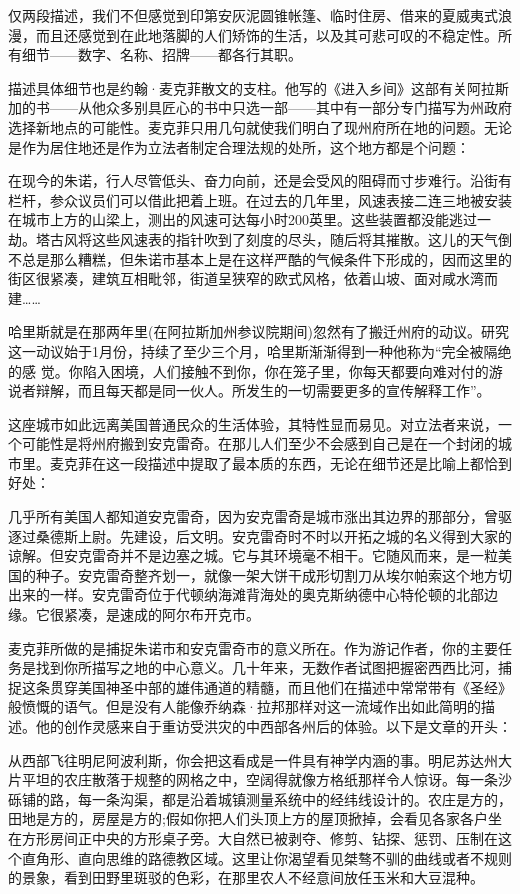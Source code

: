 仅两段描述，我们不但感觉到印第安灰泥圆锥帐篷、临时住房、借来的夏威夷式浪漫，而且还感觉到在此地落脚的人们矫饰的生活，以及其可悲可叹的不稳定性。所有细节——数字、名称、招牌——都各行其职。

描述具体细节也是约翰·麦克菲散文的支柱。他写的《进入乡间》这部有关阿拉斯加的书——从他众多别具匠心的书中只选一部——其中有一部分专门描写为州政府选择新地点的可能性。麦克菲只用几句就使我们明白了现州府所在地的问题。无论是作为居住地还是作为立法者制定合理法规的处所，这个地方都是个问题：

在现今的朱诺，行人尽管低头、奋力向前，还是会受风的阻碍而寸步难行。沿街有栏杆，参众议员们可以借此把着上班。在过去的几年里，风速表接二连三地被安装在城市上方的山梁上，测出的风速可达每小时200英里。这些装置都没能逃过一劫。塔古风将这些风速表的指针吹到了刻度的尽头，随后将其摧散。这儿的天气倒不总是那么糟糕，但朱诺市基本上是在这样严酷的气候条件下形成的，因而这里的街区很紧凑，建筑互相毗邻，街道呈狭窄的欧式风格，依着山坡、面对咸水湾而建……

哈里斯就是在那两年里(在阿拉斯加州参议院期间)忽然有了搬迁州府的动议。研究这一动议始于1月份，持续了至少三个月，哈里斯渐渐得到一种他称为“完全被隔绝的感 觉。你陷入困境，人们接触不到你，你在笼子里，你每天都要向难对付的游说者辩解，而且每天都是同一伙人。所发生的一切需要更多的宣传解释工作”。

这座城市如此远离美国普通民众的生活体验，其特性显而易见。对立法者来说，一个可能性是将州府搬到安克雷奇。在那儿人们至少不会感到自己是在一个封闭的城市里。麦克菲在这一段描述中提取了最本质的东西，无论在细节还是比喻上都恰到好处：

几乎所有美国人都知道安克雷奇，因为安克雷奇是城市涨出其边界的那部分，曾驱逐过桑德斯上尉。先建设，后文明。安克雷奇时不时以开拓之城的名义得到大家的谅解。但安克雷奇并不是边塞之城。它与其环境毫不相干。它随风而来，是一粒美国的种子。安克雷奇整齐划一，就像一架大饼干成形切割刀从埃尔帕索这个地方切出来的一样。安克雷奇位于代顿纳海滩背海处的奥克斯纳德中心特伦顿的北部边缘。它很紧凑，是速成的阿尔布开克市。

麦克菲所做的是捕捉朱诺市和安克雷奇市的意义所在。作为游记作者，你的主要任务是找到你所描写之地的中心意义。几十年来，无数作者试图把握密西西比河，捕捉这条贯穿美国神圣中部的雄伟通道的精髓，而且他们在描述中常常带有《圣经》般愤慨的语气。但是没有人能像乔纳森·拉邦那样对这一流域作出如此简明的描述。他的创作灵感来自于重访受洪灾的中西部各州后的体验。以下是文章的开头：

从西部飞往明尼阿波利斯，你会把这看成是一件具有神学内涵的事。明尼苏达州大片平坦的农庄散落于规整的网格之中，空阔得就像方格纸那样令人惊讶。每一条沙砾铺的路，每一条沟渠，都是沿着城镇测量系统中的经纬线设计的。农庄是方的，田地是方的，房屋是方的;假如你把人们头顶上方的屋顶掀掉，会看见各家各户坐在方形房间正中央的方形桌子旁。大自然已被剥夺、修剪、钻探、惩罚、压制在这个直角形、直向思维的路德教区域。这里让你渴望看见桀骜不驯的曲线或者不规则的景象，看到田野里斑驳的色彩，在那里农人不经意间放任玉米和大豆混种。

